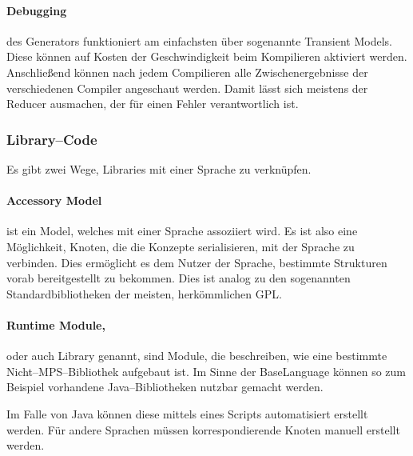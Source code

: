 \paragraph{Debugging} des Generators funktioniert am einfachsten über sogenannte Transient Models.
Diese können auf Kosten der Geschwindigkeit beim Kompilieren aktiviert werden.
Anschließend können nach jedem Compilieren alle Zwischenergebnisse der verschiedenen Compiler angeschaut werden.
Damit lässt sich meistens der Reducer ausmachen, der für einen Fehler verantwortlich ist.

\subsubsection{Library--Code}
Es gibt zwei Wege, Libraries mit einer Sprache zu verknüpfen.

\paragraph{Accessory Model} ist ein Model, welches mit einer Sprache assoziiert wird.
Es ist also eine Möglichkeit, Knoten, die die Konzepte serialisieren, mit der Sprache zu verbinden.
Dies ermöglicht es dem Nutzer der Sprache, bestimmte Strukturen vorab bereitgestellt zu bekommen.
Dies ist analog zu den sogenannten Standardbibliotheken der meisten, herkömmlichen \ac{GPL}.

\paragraph{Runtime Module,} oder auch Library genannt, sind Module, die beschreiben, wie eine bestimmte Nicht--\acs{MPS}--Bibliothek aufgebaut ist.
Im Sinne der BaseLanguage können so zum Beispiel vorhandene Java--Bibliotheken nutzbar gemacht werden.

Im Falle von Java können diese mittels eines Scripts automatisiert erstellt werden.
Für andere Sprachen müssen korrespondierende Knoten manuell erstellt werden.
